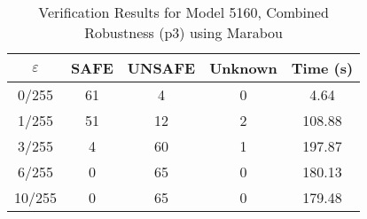 \begin{table}[htbp]
\centering
\caption{Verification Results for Model 5160, Combined Robustness (p3) using Marabou}
\label{tab:model5160_p3_marabou}
\begin{tabular}{|c|c|c|c|c|}
\hline
$\varepsilon$ & SAFE & UNSAFE & Unknown & Time (s) \\ \hline
0/255 & 61 & 4 & 0 & 4.64 \\ \hline
1/255 & 51 & 12 & 2 & 108.88 \\ \hline
3/255 & 4 & 60 & 1 & 197.87 \\ \hline
6/255 & 0 & 65 & 0 & 180.13 \\ \hline
10/255 & 0 & 65 & 0 & 179.48 \\ \hline
\end{tabular}
\end{table}
